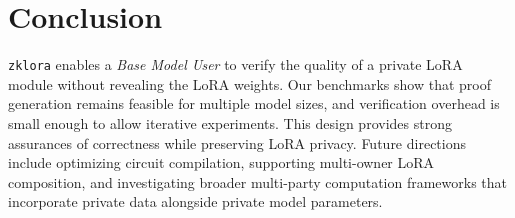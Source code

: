 \documentclass[11pt]{article}
\begin{document}
\section{Conclusion}

\texttt{zklora} enables a \emph{Base Model User} to verify the quality of a private LoRA module without revealing the LoRA weights. Our benchmarks show that proof generation remains feasible for multiple model sizes, and verification overhead is small enough to allow iterative experiments. This design provides strong assurances of correctness while preserving LoRA privacy. Future directions include optimizing circuit compilation, supporting multi-owner LoRA composition, and investigating broader multi-party computation frameworks that incorporate private data alongside private model parameters.



\end{document}
